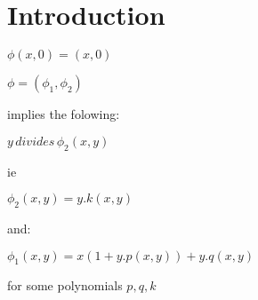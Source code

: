\documentclass{article}
\begin{document}
\section{Introduction}

$\phi(x,0)=(x,0)$

$\phi=(\phi_1,\phi_2)$

implies the folowing:

$y \,  divides \,\phi_2(x,y)$

ie

$\phi_2(x,y)=y.k(x,y)$

and:

$\phi_1(x,y)=x(1+y.p(x,y)) +y.q(x,y)$

for some polynomials $p,q,k$
\end{document}
